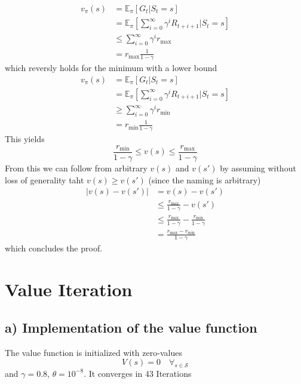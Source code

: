 \documentclass{article}
\begin{document}
\begin{align}
    v_\pi(s) &=  \mathbb{E}_\pi[G_t | S_t = s] \\
    &= \mathbb{E}_\pi [\sum_{i=0}^\infty \gamma^i R_{t+i+1}| S_t = s] \\
    &\leq \sum_{i=0}^\infty \gamma^i r_{\text{max}} \\
    &=r_{\text{max}} \frac{1}{1 - \gamma}
\end{align}
which reversly holds for the minimum with a lower bound
\begin{align}
    v_\pi(s) &=  \mathbb{E}_\pi[G_t | S_t = s] \\
    &= \mathbb{E}_\pi [\sum_{i=0}^\infty \gamma^i R_{t+i+1}| S_t = s] \\
    &\geq \sum_{i=0}^\infty \gamma^i r_{\text{min}} \\
    &=r_{\text{min}} \frac{1}{1 - \gamma}
\end{align}
 This yields
\begin{equation}
    \frac{r_{\text{min}}}{1- \gamma} \leq v(s) \leq \frac{r_{\text{max}}}{1 - \gamma}
\end{equation}
From this we can follow from arbitrary $v(s)$ and $v(s')$ by assuming without loss of generality taht $v(s) \geq v(s')$ (since the naming is arbitrary)
\begin{align}
    |v(s) - v(s')| &= v(s) - v(s') \\
    &\leq  \frac{r_{\text{max}}}{1 - \gamma} - v(s') \\ 
    &\leq  \frac{r_{\text{max}}}{1 - \gamma} -  \frac{r_{\text{min}}}{1- \gamma} \\ 
    &= \frac{r_{\text{max}}-r_{\text{min}}}{1- \gamma}
\end{align}
which concludes the proof.



\section*{Value Iteration}

\subsection*{a) Implementation of the value function}
The value function is initialized with zero-values 
\begin{equation}
    V(s) = 0 \quad \forall_{s \in \mathcal{S}}
\end{equation}
and $\gamma = 0.8$, $\theta=10^{-8}$. It converges in 43 Iterations
\end{document}
